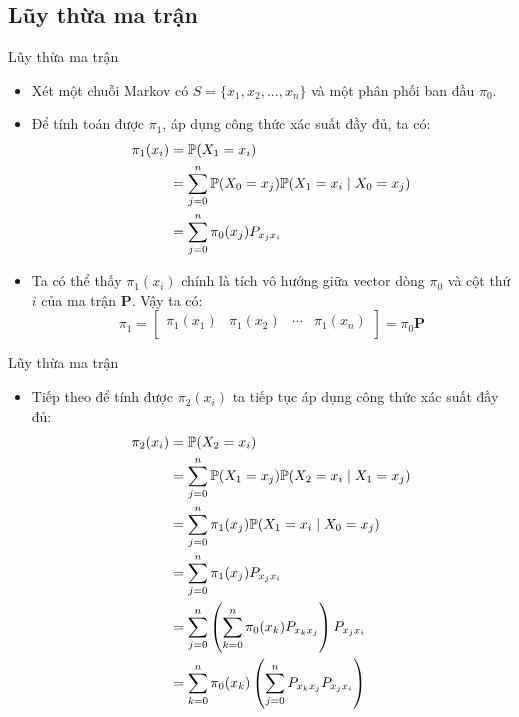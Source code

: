 \subsection{Lũy thừa ma trận}
\begin{frame}{Lũy thừa ma trận}
    \begin{itemize}
    \item[\bullet] Xét một chuỗi Markov có $S = \{x_1, x_2, ..., x_n\}$ và một phân phối ban đầu $\pi_0$. 

    \item[\bullet] Để tính toán được $\pi_1$, áp dụng công thức xác suất đầy đủ, ta có:
    $$
    \begin{aligned}
    \pi_1(x_i) &= \P(X_1 = x_i) \\ 
    &= \sum_{j = 0}^{n} \P(X_0 = x_j)\P(X_1  = x_i \mid X_0 = x_j) \\
    &= \sum_{j = 0}^{n} \pi_0(x_j) P_{x_jx_i}
    \end{aligned}
    $$

    \item[\bullet] Ta có thể thấy $\pi_1(x_i)$ chính là tích vô hướng giữa vector dòng $\pi_0$ và cột thứ $i$ của ma trận $\mathbf{P}$. Vậy ta có:
    $$
    \pi_1 = \begin{bmatrix}
        \pi_1(x_1) & \pi_1(x_2) & \dotsb & \pi_1(x_n) \\
    \end{bmatrix} = \pi_0 \mathbf{P}
    $$
    \end{itemize}
\end{frame}
\begin{frame}{Lũy thừa ma trận}
    \begin{itemize}
    \item[\bullet] Tiếp theo để tính được $\pi_2(x_i)$ ta tiếp tục áp dụng công thức xác suất đầy đủ:
    $$
    \begin{aligned}
    \pi_2(x_i) &= \P(X_2 = x_i) \\
    &= \sum_{j=0}^{n} \P(X_1 = x_j) \P(X_2 = x_i \mid X_1 = x_j) \\
    &= \sum_{j=0}^{n} \pi_1(x_j) \P(X_1 = x_i \mid X_0 = x_j) \\
    &= \sum_{j=0}^{n} \pi_1(x_j) P_{x_jx_i} \\
    &= \sum_{j=0}^{n} \left( \sum_{k=0}^{n} \pi_0(x_k) P_{x_kx_j} \right) P_{x_jx_i} \\
    &= \sum_{k=0}^{n} \pi_0(x_k) \left( \sum_{j = 0}^n P_{x_kx_j} P_{x_jx_i} \right)
    \end{aligned}
    $$
    \end{itemize}
\end{frame}
